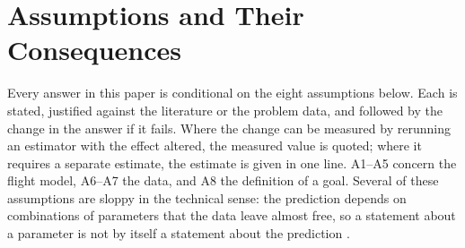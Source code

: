 \section{Assumptions and Their Consequences}
\label{sec:assumptions}

Every answer in this paper is conditional on the eight assumptions below. Each
is stated, justified against the literature or the problem data, and followed
by the change in the answer if it fails. Where the change can be measured by
rerunning an estimator with the effect altered, the measured value is quoted;
where it requires a separate estimate, the estimate is given in one line.
A1--A5 concern the flight model, A6--A7 the data, and A8 the definition of a
goal. Several of these assumptions are sloppy in the technical sense: the
prediction depends on combinations of parameters that the data leave almost
free, so a statement about a parameter is not by itself a statement about the
prediction \citep{gutenkunst2007}.

